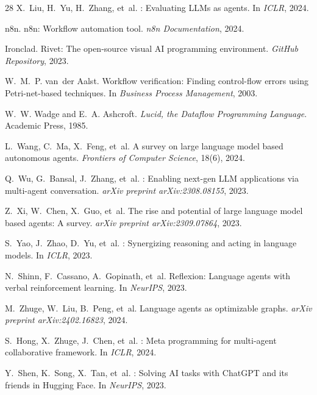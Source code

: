 \begin{thebibliography}{28}
X.~Liu, H.~Yu, H.~Zhang, et~al.
: Evaluating {LLM}s as agents.
\newblock In \emph{ICLR}, 2024.

n8n.
\newblock n8n: Workflow automation tool.
\newblock \emph{n8n Documentation}, 2024.

Ironclad.
\newblock Rivet: The open-source visual {AI} programming environment.
\newblock \emph{GitHub Repository}, 2023.

W.~M.~P. van~der Aalst.
\newblock Workflow verification: Finding control-flow errors using {Petri}-net-based techniques.
\newblock In \emph{Business Process Management}, 2003.

W.~W. Wadge and E.~A. Ashcroft.
\newblock \emph{Lucid, the Dataflow Programming Language}.
\newblock Academic Press, 1985.

L.~Wang, C.~Ma, X.~Feng, et~al.
\newblock A survey on large language model based autonomous agents.
\newblock \emph{Frontiers of Computer Science}, 18(6), 2024.

Q.~Wu, G.~Bansal, J.~Zhang, et~al.
: Enabling next-gen {LLM} applications via multi-agent conversation.
\newblock \emph{arXiv preprint arXiv:2308.08155}, 2023.

Z.~Xi, W.~Chen, X.~Guo, et~al.
\newblock The rise and potential of large language model based agents: A survey.
\newblock \emph{arXiv preprint arXiv:2309.07864}, 2023.

S.~Yao, J.~Zhao, D.~Yu, et~al.
: Synergizing reasoning and acting in language models.
\newblock In \emph{ICLR}, 2023.

N.~Shinn, F.~Cassano, A.~Gopinath, et~al.
\newblock Reflexion: Language agents with verbal reinforcement learning.
\newblock In \emph{NeurIPS}, 2023.

M.~Zhuge, W.~Liu, B.~Peng, et~al.
\newblock Language agents as optimizable graphs.
\newblock \emph{arXiv preprint arXiv:2402.16823}, 2024.

S.~Hong, X.~Zhuge, J.~Chen, et~al.
: Meta programming for multi-agent collaborative framework.
\newblock In \emph{ICLR}, 2024.

Y.~Shen, K.~Song, X.~Tan, et~al.
: Solving {AI} tasks with {ChatGPT} and its friends in {Hugging Face}.
\newblock In \emph{NeurIPS}, 2023.

\end{thebibliography}

